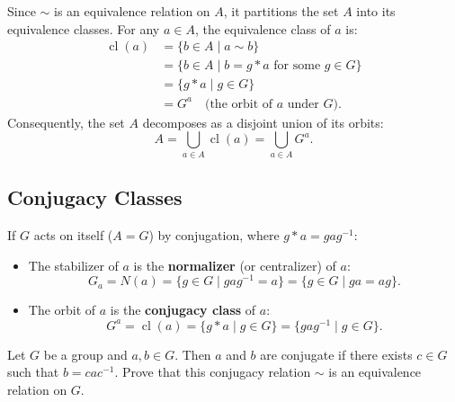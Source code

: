 Since $\sim$ is an equivalence relation on $A$, it partitions the set $A$ into its equivalence classes. For any $a \in A$, the equivalence class of $a$ is:
\begin{align*}
\operatorname{cl}(a) &= \{b \in A \mid a \sim b\} \\
&= \{b \in A \mid b = g * a \text{ for some } g \in G\} \\
&= \{g * a \mid g \in G\} \\
&= G^a \quad \text{(the orbit of $a$ under $G$)}.
\end{align*}
Consequently, the set $A$ decomposes as a disjoint union of its orbits:
\[
A = \bigcup_{a \in A} \operatorname{cl}(a) = \bigcup_{a \in A} G^a.
\]

\subsection{Conjugacy Classes}

If $G$ acts on itself ($A = G$) by conjugation, where $g * a = gag^{-1}$:
\begin{itemize}
    \item The stabilizer of $a$ is the \textbf{normalizer} (or centralizer) of $a$:
    \[
    G_a = N(a) = \{g \in G \mid gag^{-1} = a\} = \{g \in G \mid ga = ag\}.
    \]
    \item The orbit of $a$ is the \textbf{conjugacy class} of $a$:
    \[
    G^a = \operatorname{cl}(a) = \{g * a \mid g \in G\} = \{gag^{-1} \mid g \in G\}.
    \]
\end{itemize}

\begin{exercise}
Let $G$ be a group and $a, b \in G$. Then $a$ and $b$ are conjugate if there exists $c \in G$ such that $b = cac^{-1}$. Prove that this conjugacy relation $\sim$ is an equivalence relation on $G$.
\end{exercise}

